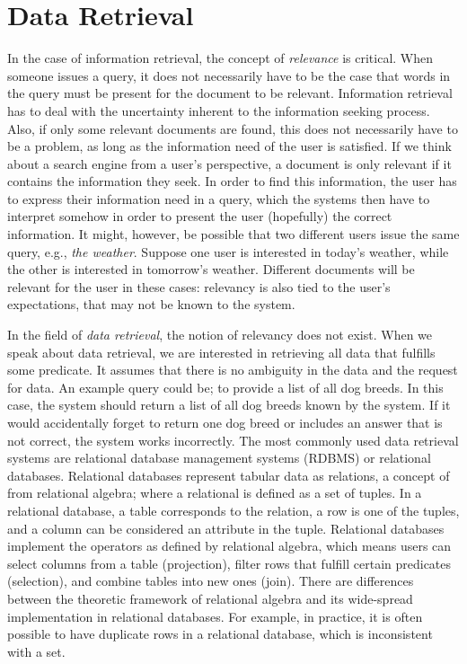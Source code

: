 \section{Data Retrieval}
In the case of information retrieval, the concept of \emph{relevance} is critical. When someone issues a query, it does not necessarily have to be the case that words in the query must be present for the document to be relevant. Information retrieval has to deal with the uncertainty inherent to the information seeking process. Also, if only some relevant documents are found, this does not necessarily have to be a problem, as long as the information need of the user is satisfied. If we think about a search engine from a user's perspective, a document is only relevant if it contains the information they seek. In order to find this information, the user has to express their information need in a query, which the systems then have to interpret somehow in order to present the user (hopefully) the correct information. 
It might, however, be possible that two different users issue the same query, e.g., \emph{the weather}. Suppose one user is interested in today's weather, while the other is interested in tomorrow's weather. Different documents will be relevant for the user in these cases: relevancy is also tied to the user's expectations, that may not be known to the system.

In the field of \emph{data retrieval}, the notion of relevancy does not exist. When we speak about data retrieval, we are interested in retrieving all data that fulfills some predicate. It assumes that there is no ambiguity in the data and the request for data. An example query could be; to provide a list of all dog breeds. In this case, the system should return a list of all dog breeds known by the system. If it would accidentally forget to return one dog breed or includes an answer that is not correct, the system works incorrectly. 
The most commonly used data retrieval systems are relational database management systems (RDBMS) or relational databases. Relational databases represent tabular data as relations, a concept of from relational algebra; where a relational is defined as a set of tuples. In a relational database, a table corresponds to the relation, a row is one of the tuples, and a column can be considered an attribute in the tuple. Relational databases implement the operators as defined by relational algebra, which means users can select columns from a table (projection), filter rows that fulfill certain predicates (selection), and combine tables into new ones (join). There are differences between the theoretic framework of relational algebra and its wide-spread implementation in relational databases. For example, in practice, it is often possible to have duplicate rows in a relational database, which is inconsistent with a set. 

